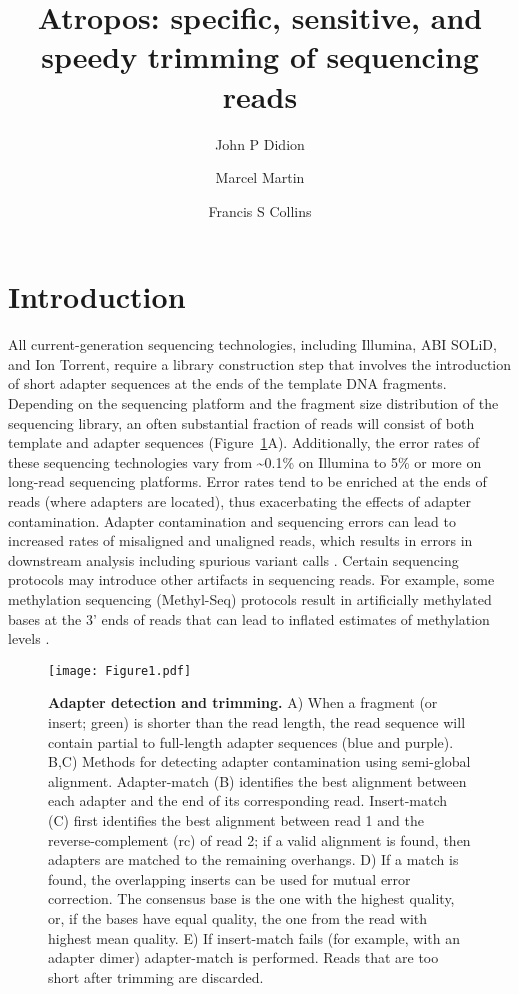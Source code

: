 \documentclass[fleqn,10pt,lineno]{wlpeerj} %
\title{Atropos: specific, sensitive, and speedy trimming of sequencing reads}
\author[1]{John P Didion}
\author[2]{Marcel Martin}
\author[1]{Francis S Collins}
\affil[1]{National Human Genome Research Institute, National Institutes of Health, Bethesda, MD}
\affil[2]{Science for Life Laboratory, Department of Biochemistry and Biophysics,
Stockholm University, Sweden}
\begin{document}
\flushbottom
\maketitle
\thispagestyle{empty}

\section{Introduction}\label{sec:intro}

All current-generation sequencing technologies, including Illumina, ABI SOLiD, and Ion Torrent, require a library construction step that involves the introduction of short adapter sequences at the ends of the template DNA fragments. Depending on the sequencing platform and the fragment size distribution of the sequencing library, an often substantial fraction of reads will consist of both template and adapter sequences (Figure~\ref{fig:overview}A). Additionally, the error rates of these sequencing technologies vary from \textasciitilde0.1\% on Illumina to 5\% or more on long-read sequencing platforms. Error rates tend to be enriched at the ends of reads (where adapters are located), thus exacerbating the effects of adapter contamination. Adapter contamination and sequencing errors can lead to increased rates of misaligned and unaligned reads, which results in errors in downstream analysis including spurious variant calls \citep{del_fabbro_extensive_2013,sturm_seqpurge:_2016}. Certain sequencing protocols may introduce other artifacts in sequencing reads. For example, some methylation sequencing (Methyl-Seq) protocols result in artificially methylated bases at the 3' ends of reads that can lead to inflated estimates of methylation levels \citep{bock_analysing_2012}.

\begin{figure}[!ht]
\centering
\texttt{[image: Figure1.pdf]}
\caption{\textbf{Adapter detection and trimming.} A) When a fragment (or insert; green) is shorter than the read length, the read sequence will contain partial to full-length adapter sequences (blue and purple). B,C) Methods for detecting adapter contamination using semi-global alignment. Adapter-match (B) identifies the best alignment between each adapter and the end of its corresponding read. Insert-match (C) first identifies the best alignment between read 1 and the reverse-complement (rc) of read 2; if a valid alignment is found, then adapters are matched to the remaining overhangs. D) If a match is found, the overlapping inserts can be used for mutual error correction. The consensus base is the one with the highest quality, or, if the bases have equal quality, the one from the read with highest mean quality. E) If insert-match fails (for example, with an adapter dimer) adapter-match is performed. Reads that are too short after trimming are discarded.}
\label{fig:overview}
\end{figure}
\end{document}
